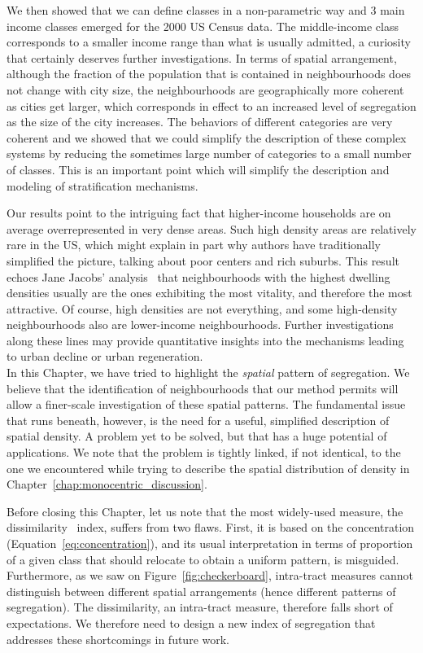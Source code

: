 We then showed that we can define classes in a non-parametric way and 3 main
income classes emerged for the 2000 US Census data. The middle-income class
corresponds to a smaller income range than what is usually admitted, a curiosity
that certainly deserves further investigations. In terms of spatial arrangement,
although the fraction of the population that is contained in neighbourhoods does
not change with city size, the neighbourhoods are geographically more coherent
as cities get larger, which corresponds in effect to an increased level of
segregation as the size of the city increases. The behaviors of different
categories are very coherent and we showed that we could simplify the
description of these complex systems by reducing the sometimes large number of
categories to a small number of classes. This is an important point which will
simplify the description and modeling of stratification mechanisms.

Our results point to the intriguing fact that higher-income households are on
average overrepresented in very dense areas. Such high density areas are
relatively rare in the US, which might explain in part why authors have
traditionally simplified the picture, talking about poor
centers and rich suburbs. This result echoes Jane Jacobs' analysis~\cite{Jacobs:1961}
that neighbourhoods with the highest dwelling densities usually are the ones
exhibiting the most vitality, and therefore the most attractive. Of course, high
densities are not everything, and some high-density neighbourhoods also are
lower-income neighbourhoods. Further investigations along these lines may
provide quantitative insights into the mechanisms leading to urban decline or
urban regeneration.\\

In this Chapter, we have tried to highlight the \emph{spatial} pattern of
segregation.  We believe that the identification of neighbourhoods that our
method permits will allow a finer-scale investigation of these spatial patterns.
The fundamental issue that runs beneath, however,  is the need for a useful,
simplified description of spatial density. A problem yet to be solved, but that
has a huge potential of applications. We note that the problem is tightly
linked, if not identical, to the one we encountered while trying to describe the
spatial distribution of density in Chapter~\ref{chap:monocentric_discussion}.

Before closing this Chapter, let us note that the most widely-used measure,
the dissimilarity~\cite{Duncan:1955m} index, suffers from two flaws. First, it
is based on the concentration (Equation~\ref{eq:concentration}), and its usual
interpretation in terms of proportion of a given class that should relocate to
obtain a uniform pattern, is misguided. Furthermore, as we saw on
Figure~\ref{fig:checkerboard}, intra-tract measures cannot distinguish between
different spatial arrangements (hence different patterns of segregation). The
dissimilarity, an intra-tract measure, therefore falls short of expectations. We
therefore need to design a new index of segregation that addresses these
shortcomings in future work.
